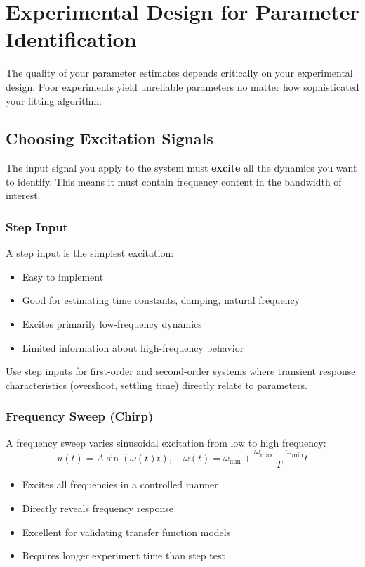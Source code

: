 \section{Experimental Design for Parameter Identification}

The quality of your parameter estimates depends critically on your experimental design. Poor experiments yield unreliable parameters no matter how sophisticated your fitting algorithm.

\subsection{Choosing Excitation Signals}

The input signal you apply to the system must \textbf{excite} all the dynamics you want to identify. This means it must contain frequency content in the bandwidth of interest.

\subsubsection{Step Input}

A step input is the simplest excitation:
\begin{itemize}
    \item Easy to implement
    \item Good for estimating time constants, damping, natural frequency
    \item Excites primarily low-frequency dynamics
    \item Limited information about high-frequency behavior
\end{itemize}

Use step inputs for first-order and second-order systems where transient response characteristics (overshoot, settling time) directly relate to parameters.

\subsubsection{Frequency Sweep (Chirp)}

A frequency sweep varies sinusoidal excitation from low to high frequency:
\begin{equation}
u(t) = A \sin(\omega(t) t), \quad \omega(t) = \omega_{\min} + \frac{\omega_{\max} - \omega_{\min}}{T} t
\end{equation}

\begin{itemize}
    \item Excites all frequencies in a controlled manner
    \item Directly reveals frequency response
    \item Excellent for validating transfer function models
    \item Requires longer experiment time than step test
\end{itemize}

